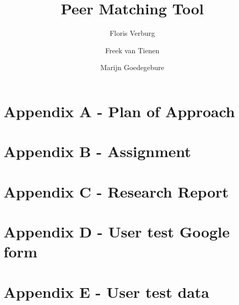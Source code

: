 \documentclass{tudelft-report}
\begin{document}
\frontmatter

\title[TI3800 Bachelorproject]{Peer Matching Tool}
\author{Floris Verburg \and Freek van Tienen \and Marijn Goedegebure}
\makecover







\tableofcontents

\mainmatter













\appendix

%
\chapter{Appendix A - Plan of Approach}


\chapter{Appendix B - Assignment}


\chapter{Appendix C - Research Report}


\chapter{Appendix D - User test Google form}


\chapter{Appendix E - User test data}


%
%



\end{document}
